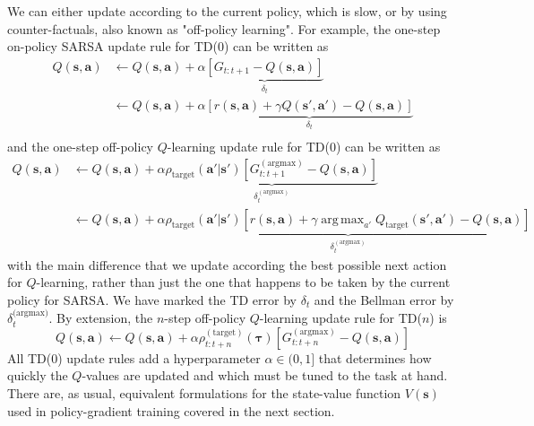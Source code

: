 \documentclass{article}
\DeclareMathOperator*{\argmax}{arg\,max}
\begin{document}
We can either update according to the current policy, which is slow, or by using counter-factuals, also known as "off-policy learning". For example, the one-step on-policy SARSA update rule for TD(0) can be written as
\begin{equation}
\label{eq:SARSA_update}
\begin{split}
Q(\mathbf{s},\mathbf{a})&\leftarrow Q(\mathbf{s},\mathbf{a})+\alpha\underbrace{\left[G_{t:t+1}-Q(\mathbf{s},\mathbf{a})\right]}_\text{$\delta_t$}\\
&\leftarrow Q(\mathbf{s},\mathbf{a})+\alpha\underbrace{\left[r(\mathbf{s},\mathbf{a})+\gamma Q(\mathbf{s}',\mathbf{a}')-Q(\mathbf{s},\mathbf{a})\right]}_\text{$\delta_t$}\\
\end{split}
\end{equation}and the one-step off-policy $Q$-learning update rule for TD(0) can be written as
\begin{equation}\begin{split}\label{eq:q_learning_update}
Q(\mathbf{s},\mathbf{a})&\leftarrow Q(\mathbf{s},\mathbf{a})+\alpha\underbrace{\rho_\text{target}(\mathbf{a}'|\mathbf{s}')\left[G_{t:t+1}^{(\text{argmax})}-Q(\mathbf{s},\mathbf{a})\right]}_{\delta_t^{(\text{argmax})}}\\&\leftarrow Q(\mathbf{s},\mathbf{a})+\alpha\underbrace{\rho_\text{target}(\mathbf{a}'|\mathbf{s}')\left[r(\mathbf{s},\mathbf{a})+\gamma \argmax_{a'}Q_\text{target}(\mathbf{s}',\mathbf{a}')-Q(\mathbf{s},\mathbf{a})\right]}_{\delta_t^{(\text{argmax})}}
\end{split}\end{equation}with the main difference that we update according the best possible next action for $Q$-learning, rather than just the one that happens to be taken by the current policy for SARSA. We have marked the TD error by $\delta_t$ and the Bellman error by $\delta_t^\text{(argmax)}$. By extension, the $n$-step off-policy $Q$-learning update rule for TD($n$) is
\begin{equation}\label{eq:n_step_q_learning_update}
Q(\mathbf{s},\mathbf{a})\leftarrow Q(\mathbf{s},\mathbf{a})+\alpha\rho^{(\text{target})}_{ t:t+n}(\boldsymbol{\tau})\left[G_{t:t+n}^{(\text{argmax})}-Q(\mathbf{s},\mathbf{a})\right]\end{equation}All TD(0) update rules add a hyperparameter $\alpha\in(0,1]$ that determines how quickly the $Q$-values are updated and which must be tuned to the task at hand. There are, as usual, equivalent formulations for the state-value function $V(\mathbf{s})$ used in policy-gradient training covered in the next section.
\end{document}
